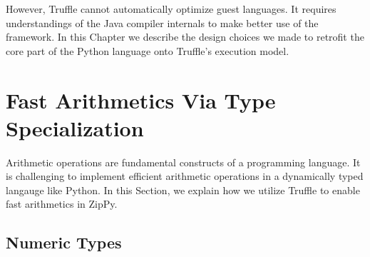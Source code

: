 However, Truffle cannot automatically optimize guest languages.
It requires understandings of the Java compiler internals to make better use of the framework.
In this Chapter we describe the design choices we made to retrofit the core part of the Python language onto Truffle's execution model.

\section{Fast Arithmetics Via Type Specialization}
\label{sec:ch3-fast-arithmetics}

Arithmetic operations are fundamental constructs of a programming language.
It is challenging to implement efficient arithmetic operations in a dynamically typed langauge like Python.
In this Section, we explain how we utilize Truffle to enable fast arithmetics in ZipPy.

\subsection{Numeric Types}
\label{sec:numeric-types}

